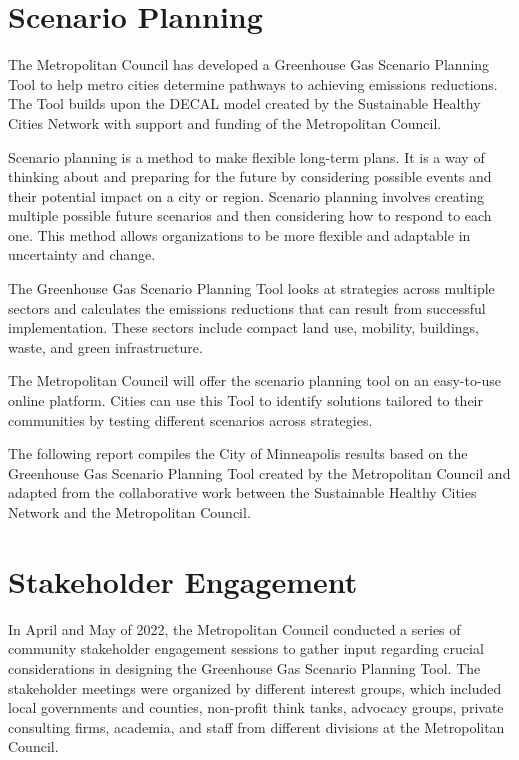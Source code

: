 \documentclass[
]{book}
\begin{document}
\hypertarget{scenario-planning}{%
\section{Scenario Planning}\label{scenario-planning}}

The Metropolitan Council has developed a Greenhouse Gas Scenario Planning Tool to help metro cities determine pathways to achieving emissions reductions. The Tool builds upon the DECAL model created by the Sustainable Healthy Cities Network with support and funding of the Metropolitan Council.

Scenario planning is a method to make flexible long-term plans. It is a way of thinking about and preparing for the future by considering possible events and their potential impact on a city or region. Scenario planning involves creating multiple possible future scenarios and then considering how to respond to each one. This method allows organizations to be more flexible and adaptable in uncertainty and change.

The Greenhouse Gas Scenario Planning Tool looks at strategies across multiple sectors and calculates the emissions reductions that can result from successful implementation. These sectors include compact land use, mobility, buildings, waste, and green infrastructure.

The Metropolitan Council will offer the scenario planning tool on an easy-to-use online platform. Cities can use this Tool to identify solutions tailored to their communities by testing different scenarios across strategies.

The following report compiles the City of Minneapolis results based on the Greenhouse Gas Scenario Planning Tool created by the Metropolitan Council and adapted from the collaborative work between the Sustainable Healthy Cities Network and the Metropolitan Council.

\hypertarget{stakeholder-engagement}{%
\section{Stakeholder Engagement}\label{stakeholder-engagement}}

In April and May of 2022, the Metropolitan Council conducted a series of community stakeholder engagement sessions to gather input regarding crucial considerations in designing the Greenhouse Gas Scenario Planning Tool. The stakeholder meetings were organized by different interest groups, which included local governments and counties, non-profit think tanks, advocacy groups, private consulting firms, academia, and staff from different divisions at the Metropolitan Council.
\end{document}
